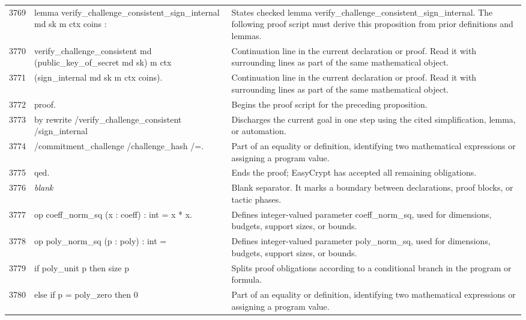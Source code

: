 \documentclass[10pt]{article}
\begin{document}
\begin{longtable}{r L{0.53\textwidth} L{0.37\textwidth}}
3769 & {\ttfamily\scriptsize lemma verify\_challenge\_consistent\_sign\_internal md sk m ctx coins :} & States checked lemma verify\_challenge\_consistent\_sign\_internal.  The following proof script must derive this proposition from prior definitions and lemmas. \\
3770 & {\ttfamily\scriptsize   verify\_challenge\_consistent md (public\_key\_of\_secret md sk) m ctx} & Continuation line in the current declaration or proof.  Read it with surrounding lines as part of the same mathematical object. \\
3771 & {\ttfamily\scriptsize     (sign\_internal md sk m ctx coins).} & Continuation line in the current declaration or proof.  Read it with surrounding lines as part of the same mathematical object. \\
3772 & {\ttfamily\scriptsize proof.} & Begins the proof script for the preceding proposition. \\
3773 & {\ttfamily\scriptsize by rewrite /verify\_challenge\_consistent /sign\_internal} & Discharges the current goal in one step using the cited simplification, lemma, or automation. \\
3774 & {\ttfamily\scriptsize            /commitment\_challenge /challenge\_hash /=.} & Part of an equality or definition, identifying two mathematical expressions or assigning a program value. \\
3775 & {\ttfamily\scriptsize qed.} & Ends the proof; EasyCrypt has accepted all remaining obligations. \\
3776 & {\ttfamily\scriptsize \emph{blank}} & Blank separator.  It marks a boundary between declarations, proof blocks, or tactic phases. \\
3777 & {\ttfamily\scriptsize op coeff\_norm\_sq (x : coeff) : int = x * x.} & Defines integer-valued parameter coeff\_norm\_sq, used for dimensions, budgets, support sizes, or bounds. \\
3778 & {\ttfamily\scriptsize op poly\_norm\_sq (p : poly) : int =} & Defines integer-valued parameter poly\_norm\_sq, used for dimensions, budgets, support sizes, or bounds. \\
3779 & {\ttfamily\scriptsize   if poly\_unit p then size p} & Splits proof obligations according to a conditional branch in the program or formula. \\
3780 & {\ttfamily\scriptsize   else if p = poly\_zero then 0} & Part of an equality or definition, identifying two mathematical expressions or assigning a program value. \\

\end{longtable}
\end{document}

